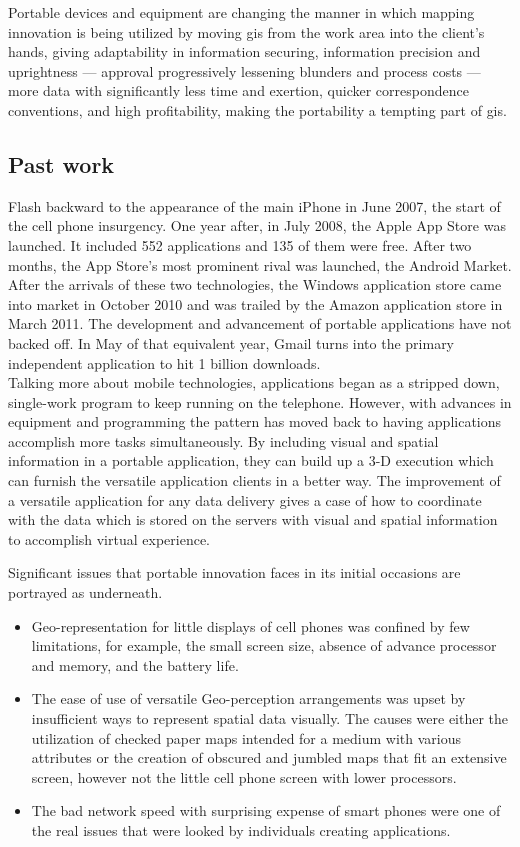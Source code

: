 Portable devices and equipment are changing the manner in which mapping innovation is being utilized by moving \gls{gis} from the work area into the client's hands, giving adaptability in information securing, information precision and uprightness — approval progressively lessening blunders and process costs — more data with significantly less time and exertion, quicker correspondence conventions, and high profitability, making the portability a tempting part of \gls{gis}.

\subsection{Past work}

Flash backward to the appearance of the main iPhone in June 2007, the start of the cell phone insurgency. One year after, in July 2008, the Apple App Store was launched. It included 552 applications and 135 of them were free. After two months, the App Store's most prominent rival was launched, the Android Market. After the arrivals of these two technologies, the Windows application store came into market in October 2010 and was trailed by the Amazon application store in March 2011. The development and advancement of portable applications have not backed off. In May of that equivalent year, Gmail turns into the primary independent application to hit 1 billion downloads. \\
Talking more about mobile technologies, applications began as a stripped down, single-work program to keep running on the telephone. However, with advances in equipment and programming the pattern has moved back to having applications accomplish more tasks simultaneously. By including visual and spatial information in a portable application, they can build up a 3-D execution which can furnish the versatile application clients in a better way. The improvement of a versatile application for any data delivery gives a case of how to coordinate with the data which is stored on the servers with visual and spatial information to accomplish virtual experience.

Significant issues that portable innovation faces in its initial occasions are portrayed as underneath.

\begin{itemize}
  \item Geo-representation for little displays of cell phones was confined by few limitations, for example, the small screen size, absence of advance processor and memory, and the battery life.
  
  \item The ease of use of versatile Geo-perception arrangements was upset by insufficient ways to represent spatial data visually. The causes were either the utilization of checked paper maps intended for a medium with various attributes or the creation of obscured and jumbled maps that fit an extensive screen, however not the little cell phone screen with lower processors.
  
  \item The bad network speed with surprising expense of smart phones were one of the real issues that were looked by individuals creating applications.
\end{itemize}

